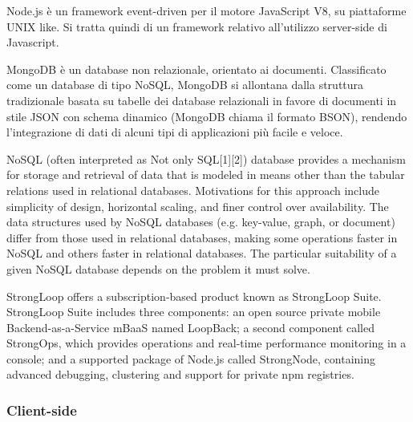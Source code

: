 \documentclass{sig-alternate}
\begin{document}
\begin{description}
\itemsep1pt\parskip0pt
  \item[Node.js web framework] 
    Node.js è un framework event-driven per il motore JavaScript V8, su piattaforme UNIX like. Si tratta quindi di un framework relativo all'utilizzo server-side di Javascript.
  \item[MongDB]
    MongoDB è un database non relazionale, orientato ai documenti. Classificato come un database di tipo NoSQL, MongoDB si allontana dalla struttura tradizionale basata su tabelle dei database relazionali in favore di documenti in stile JSON con schema dinamico (MongoDB chiama il formato BSON), rendendo l'integrazione di dati di alcuni tipi di applicazioni più facile e veloce.
\item[NoSQL]
    NoSQL (often interpreted as Not only SQL[1][2]) database provides a mechanism for storage and retrieval of data that is modeled in means other than the tabular relations used in relational databases. Motivations for this approach include simplicity of design, horizontal scaling, and finer control over availability. The data structures used by NoSQL databases (e.g. key-value, graph, or document) differ from those used in relational databases, making some operations faster in NoSQL and others faster in relational databases. The particular suitability of a given NoSQL database depends on the problem it must solve. 
  \item[Strongloop]
    StrongLoop offers a subscription-based product known as StrongLoop Suite. StrongLoop Suite includes three components: an open source private mobile Backend-as-a-Service mBaaS named LoopBack; a second component called StrongOps, which provides operations and real-time performance monitoring in a console; and a supported package of Node.js called StrongNode, containing advanced debugging, clustering and support for private npm registries.
\end{description}

\subsubsection{Client-side}

\begin{description}
\itemsep1pt\parskip0pt
       \item[Polymer.js]
       \item[Web Components] 
\end{description}
\end{document}
